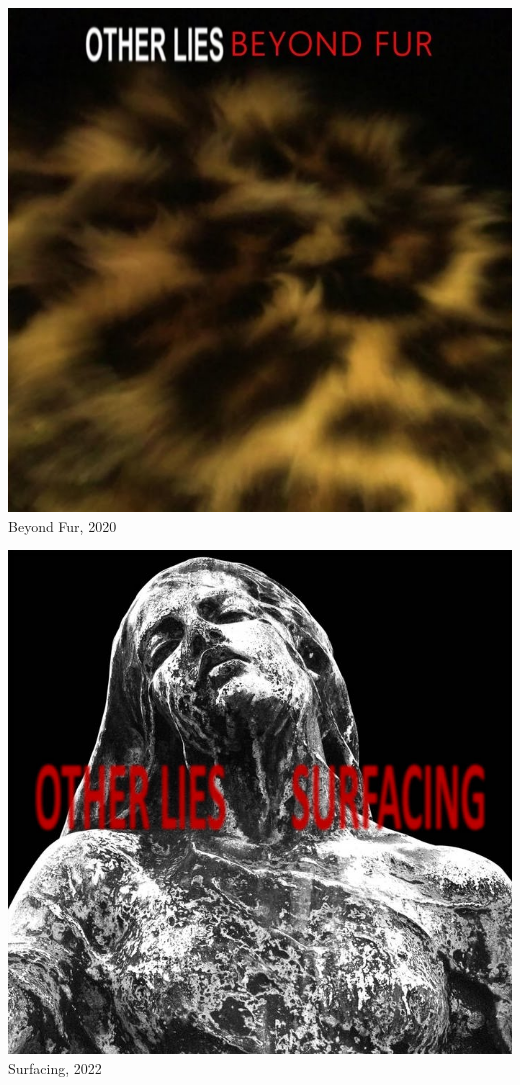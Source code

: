 \begin{titlepage}
  \maketitle
  \thispagestyle{empty}
  \setcounter{page}{0}

  \vspace{2em}
  
  \begin{minipage}[t]{.5\textwidth}
    \centering
    \includegraphics[width=0.8\linewidth]{1-Beyond-Fur/beyond-fur.jpg}
    {\Large \sffamily Beyond Fur, 2020}
  \end{minipage}%
  \begin{minipage}[t]{0.5\textwidth}
    \centering
    \includegraphics[width=0.8\linewidth]{2-Surfacing/surfacing.jpg}
    {\Large \sffamily Surfacing, 2022}
  \end{minipage}
  

\end{titlepage}
